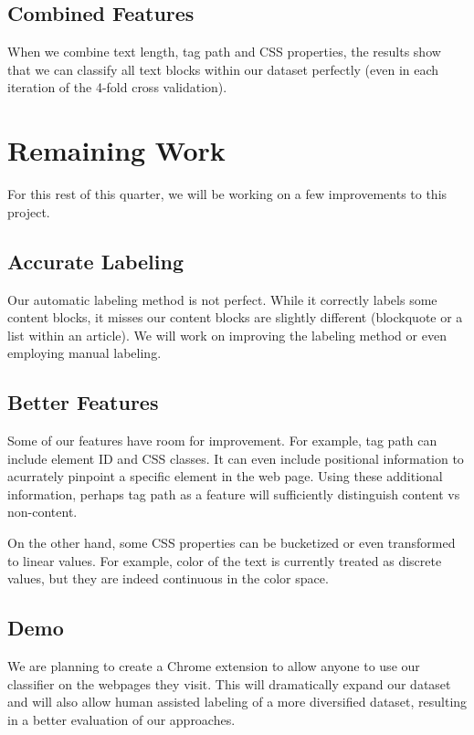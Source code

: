 \documentclass{acm_proc_article-sp}
\begin{document}
\subsection{Combined Features}

When we combine text length, tag path and CSS properties, the results show that we can classify all text blocks within our dataset perfectly (even in each iteration of the 4-fold cross validation).


\section{Remaining Work}

For this rest of this quarter, we will be working on a few improvements to this project.

\subsection{Accurate Labeling}
Our automatic labeling method is not perfect. While it correctly labels some content blocks, it misses our content blocks are slightly different (blockquote or a list within an article). We will work on improving the labeling method or even employing manual labeling.

\subsection{Better Features}
Some of our features have room for improvement. For example, tag path can include element ID and CSS classes. It can even include positional information to acurrately pinpoint a specific element in the web page. Using these additional information, perhaps tag path as a feature will sufficiently distinguish content vs non-content.

On the other hand, some CSS properties can be bucketized or even transformed to linear values. For example, color of the text is currently treated as discrete values, but they are indeed continuous in the color space.

\subsection{Demo}
We are planning to create a Chrome extension to allow anyone to use our classifier on the webpages they visit. This will dramatically expand our dataset and will also allow human assisted labeling of a more diversified dataset, resulting in a better evaluation of our approaches.
\end{document}
